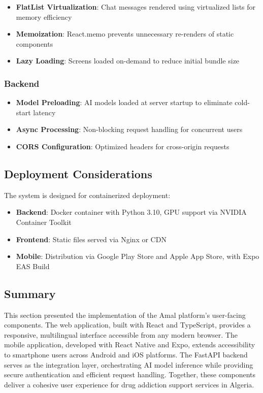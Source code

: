 \begin{itemize}
    \item \textbf{FlatList Virtualization}: Chat messages rendered using virtualized lists for memory efficiency
    \item \textbf{Memoization}: React.memo prevents unnecessary re-renders of static components
    \item \textbf{Lazy Loading}: Screens loaded on-demand to reduce initial bundle size
\end{itemize}

\subsubsection{Backend}

\begin{itemize}
    \item \textbf{Model Preloading}: AI models loaded at server startup to eliminate cold-start latency
    \item \textbf{Async Processing}: Non-blocking request handling for concurrent users
    \item \textbf{CORS Configuration}: Optimized headers for cross-origin requests
\end{itemize}

\subsection{Deployment Considerations}

The system is designed for containerized deployment:

\begin{itemize}
    \item \textbf{Backend}: Docker container with Python 3.10, GPU support via NVIDIA Container Toolkit
    \item \textbf{Frontend}: Static files served via Nginx or CDN
    \item \textbf{Mobile}: Distribution via Google Play Store and Apple App Store, with Expo EAS Build
\end{itemize}

\subsection{Summary}

This section presented the implementation of the Amal platform's user-facing components. The web application, built with React and TypeScript, provides a responsive, multilingual interface accessible from any modern browser. The mobile application, developed with React Native and Expo, extends accessibility to smartphone users across Android and iOS platforms. The FastAPI backend serves as the integration layer, orchestrating AI model inference while providing secure authentication and efficient request handling. Together, these components deliver a cohesive user experience for drug addiction support services in Algeria.

